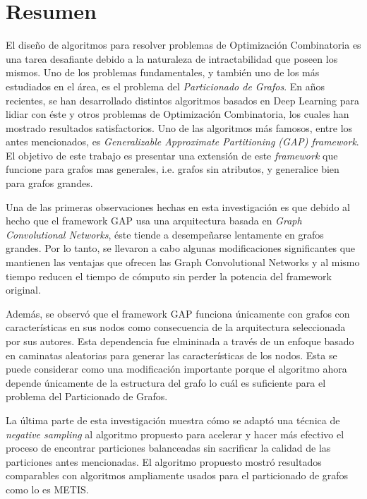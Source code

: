 

\chapter*{Resumen}

El diseño de algoritmos para resolver problemas de Optimización Combinatoria es una tarea desafiante debido a la naturaleza de intractabilidad que poseen los mismos. Uno de los problemas fundamentales, y también uno de los más estudiados en el área, es el problema del \textit{Particionado de Grafos}. En años recientes, se han desarrollado distintos algoritmos basados en Deep Learning para lidiar con éste y otros problemas de Optimización Combinatoria, los cuales han mostrado resultados satisfactorios. Uno de las algoritmos más famosos, entre los antes mencionados, es \textit{Generalizable Approximate Partitioning (GAP) framework}. El objetivo de este trabajo es presentar una extensión de este \textit{framework} que funcione para grafos mas generales, i.e. grafos sin atributos, y generalice bien para grafos grandes.  

Una de las primeras observaciones hechas en esta investigación es que debido al hecho que el framework GAP usa una arquitectura basada en \textit{Graph Convolutional Networks}, éste tiende a desempeñarse lentamente en grafos grandes. Por lo tanto, se llevaron a cabo algunas modificaciones significantes que mantienen las ventajas que ofrecen las Graph Convolutional Networks y al mismo tiempo reducen el tiempo de cómputo sin perder la potencia del framework original.

Además, se observó que el framework GAP funciona únicamente con grafos con características en sus nodos como consecuencia de la arquitectura seleccionada por sus autores. Esta dependencia fue elmininada a través de un enfoque basado en caminatas aleatorias para generar las características de los nodos. Esta se puede considerar como una modificación importante porque el algoritmo ahora depende únicamente de la estructura del grafo lo cuál es suficiente para el problema del Particionado de Grafos.

La última parte de esta investigación muestra cómo se adaptó una técnica de \textit{negative sampling} al algoritmo propuesto para acelerar y hacer más efectivo el proceso de encontrar particiones balanceadas sin sacrificar la calidad de las particiones antes mencionadas. El algoritmo propuesto mostró resultados comparables con algoritmos ampliamente usados para el particionado de grafos como lo es METIS.

